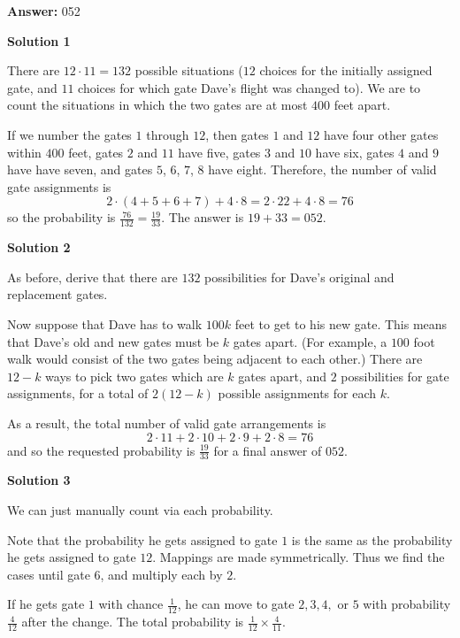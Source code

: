 \begin{enumerate}
 
 \textbf{Answer: }052



\textbf{Solution 1}

There are $12 \cdot 11 = 132$ possible situations ($12$ choices for the initially assigned gate, and $11$ choices for which gate Dave's flight was changed to). We are to count the situations in which the two gates are at most $400$ feet apart.

 If we number the gates $1$ through $12$, then gates $1$ and $12$ have four other gates within $400$ feet, gates $2$ and $11$ have five, gates $3$ and $10$ have six, gates $4$ and $9$ have have seven, and gates $5$, $6$, $7$, $8$ have eight. Therefore, the number of valid gate assignments is 
 \[2\cdot(4+5+6+7)+4\cdot8 = 2 \cdot 22 + 4 \cdot 8 = 76\] so the probability is $\frac{76}{132} = \frac{19}{33}$. The answer is $19 + 33 = \boxed{052}$.

 



\textbf{Solution 2}

As before, derive that there are $132$ possibilities for Dave's original and replacement gates.

 Now suppose that Dave has to walk $100k$ feet to get to his new gate.  This means that Dave's old and new gates must be $k$ gates apart.  (For example, a $100$ foot walk would consist of the two gates being adjacent to each other.)  There are $12-k$ ways to pick two gates which are $k$ gates apart, and $2$ possibilities for gate assignments, for a total of $2(12-k)$ possible assignments for each $k$.

 As a result, the total number of valid gate arrangements is 
 \[2\cdot 11 + 2\cdot 10 + 2\cdot 9 + 2\cdot 8 = 76\] and so the requested probability is $\frac{19}{33}$ for a final answer of $\boxed{052}$.

 



\textbf{Solution 3}

We can just manually count via each probability.

 Note that the probability he gets assigned to gate \( 1 \) is the same as the probability he gets assigned to gate \( 12 \). Mappings are made symmetrically. Thus we find the cases until gate \( 6 \), and multiply each by \( 2 \).

 If he gets gate \( 1 \) with chance \( \frac{1}{12} \), he can move to gate \( 2, 3, 4, \) or \( 5 \) with probability \( \frac{4}{12} \) after the change. The total probability is \( \frac{1}{12} \times \frac{4}{11} \).


\end{enumerate}
